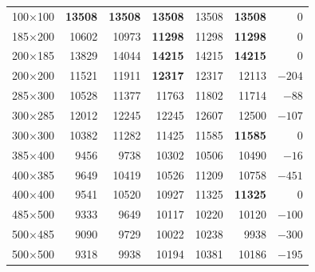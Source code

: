 \begin{table}[H]
\begin{tabular}{lrrrrrr}
100$\times$100 & \textbf{13508} & \textbf{13508} & \textbf{13508} & 13508 & \textbf{13508} & 0\\
185$\times$200 & 10602 & 10973 & \textbf{11298} & 11298 & \textbf{11298} & 0\\
200$\times$185 & 13829 & 14044 & \textbf{14215} & 14215 & \textbf{14215} & 0\\
200$\times$200 & 11521 & 11911 & \textbf{12317} & 12317 & 12113 & $-204$\\
285$\times$300 & 10528 & 11377 & 11763 & 11802 & 11714 & $-88$\\
300$\times$285 & 12012 & 12245 & 12245 & 12607 & 12500 & $-107$\\
300$\times$300 & 10382 & 11282 & 11425 & 11585 & \textbf{11585} & 0\\
385$\times$400 & 9456 & 9738 & 10302 & 10506 & 10490 & $-16$\\
400$\times$385 & 9649 & 10419 & 10526 & 11209 & 10758 & $-451$\\
400$\times$400 & 9541 & 10520 & 10927 & 11325 & \textbf{11325} & 0\\
485$\times$500 & 9333 & 9649 & 10117 & 10220 & 10120 & $-100$\\
500$\times$485 & 9090 & 9729 & 10022 & 10238 & 9938 & $-300$\\
500$\times$500 & 9318 & 9938 & 10194 & 10381 & 10186 & $-195$\\
\bottomrule
\end{tabular}
\end{table}
